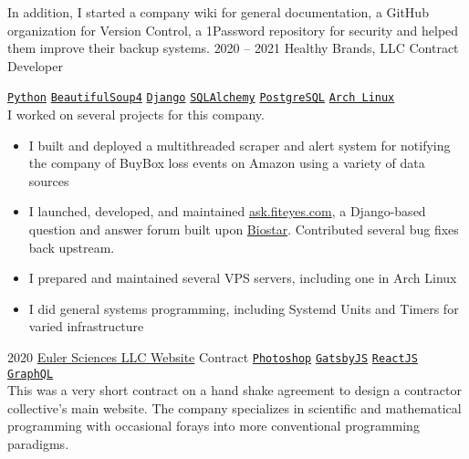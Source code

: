 \documentclass[9pt]{developercv} %
\begin{document}
\begin{entrylist}
{            In addition, I started a company wiki for general documentation, a
            GitHub organization for Version Control, a 1Password repository for
            security and helped them improve their backup systems.
        }
    \entry
        {2020 -- 2021}
        {Healthy Brands, LLC}
        {Contract Developer}
        {
            \texttt{{\href{https://www.python.org/}{Python}}}\slashsep
            \texttt{{\href{https://www.crummy.com/software/BeautifulSoup/bs4/doc/}{BeautifulSoup4}}}\slashsep
            \texttt{{\href{https://www.djangoproject.com/}{Django}}}\slashsep
            \texttt{{\href{https://www.sqlalchemy.org/}{SQLAlchemy}}}\slashsep
            \texttt{{\href{https://www.postgresql.org/}{PostgreSQL}}}\slashsep
            \texttt{{\href{https://archlinux.org/}{Arch Linux}}}\\
            I worked on several projects for this company.
            \begin{itemize}[leftmargin=*]
                \item I built and deployed a multithreaded scraper and alert system for notifying the company of BuyBox loss events on Amazon using a variety of data sources
                \item I launched, developed, and maintained {\href{https://ask.fiteyes.com}{ask.fiteyes.com}}, a Django-based question and answer forum built upon {\href{https://github.com/ialbert/biostar-central}{Biostar}}.  Contributed several bug fixes back upstream.
                \item I prepared and maintained several VPS servers, including one in Arch Linux
                \item I did general systems programming, including Systemd Units and Timers for varied infrastructure
            \end{itemize}
        }
    \entry
        {2020}
        {\href{https://euler-sci.com}{Euler Sciences LLC Website}}
        {Contract}
        {
            \texttt{{\href{https://www.adobe.com/products/photoshop.html}{Photoshop}}}\slashsep
            \texttt{{\href{https://www.gatsbyjs.org/}{GatsbyJS}}}\slashsep
            \texttt{{\href{https://reactjs.org/}{ReactJS}}}\slashsep
            \texttt{{\href{https://graphql.org/}{GraphQL}}}\\
            This was a very short contract on a hand shake agreement to design a
            contractor collective's main website. The company specializes in
            scientific and mathematical programming with occasional forays into
            more conventional programming paradigms.\\

}
\end{entrylist}
\end{document}
